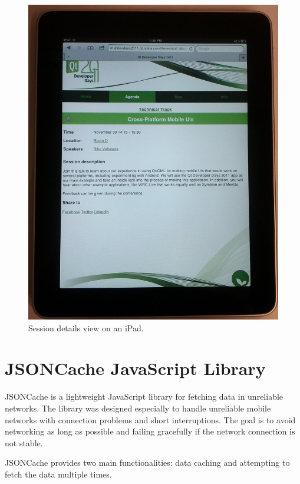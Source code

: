 \begin{figure}[ht]
  \begin{center}
    \includegraphics[width=\textwidth]{images/ipad-session.jpg}
    \caption{Session details view on an iPad.}
    \label{figure:ipad-session.jpg}
  \end{center}
\end{figure}

\section{JSONCache JavaScript Library}
\label{section:jsoncache}

JSONCache is a lightweight JavaScript library for fetching 
data in unreliable networks. The library was designed especially to
handle unreliable mobile networks with connection problems and short
interruptions. The goal is to avoid networking as long as possible and
failing gracefully if the network connection is not stable.

JSONCache provides two main functionalities: data caching and
attempting to fetch the data multiple times.

